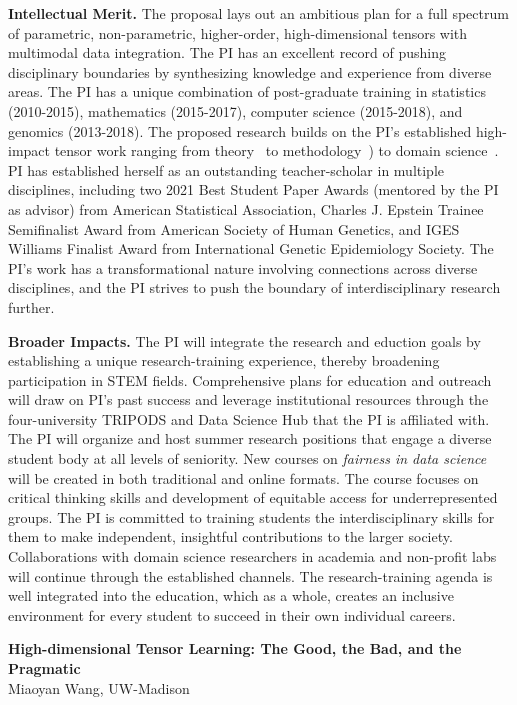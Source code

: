 \documentclass[11pt]{article}
\theoremstyle{exampstyle}
\theoremstyle{definition}
\begin{document}
{\bf Intellectual Merit.} The proposal lays out an ambitious plan for a full spectrum of parametric, non-parametric, higher-order, high-dimensional tensors with multimodal data integration. 
The PI has an excellent record of pushing disciplinary boundaries by synthesizing knowledge and experience from diverse areas. The PI has a unique combination of post-graduate training in statistics (2010-2015), mathematics (2015-2017), computer science (2015-2018), and genomics (2013-2018). The proposed research builds on the PI's established high-impact tensor work ranging from theory~\cite{wang2018learning, han2020exact,wang7,wang8,wang2} to methodology~\cite{wang2019multiway, wang1, wang3, wang4, pmlr-v119-lee20i}) to domain science~\cite{wang2019three,wang5,wang9,wang6,wang10}. PI has established herself as an outstanding teacher-scholar in multiple disciplines, including two 2021 Best Student Paper Awards (mentored by the PI as advisor) from American Statistical Association, Charles J. Epstein Trainee Semifinalist Award from American Society of Human Genetics, and IGES Williams Finalist Award from International Genetic Epidemiology Society. The PI’s work has a transformational nature involving connections across diverse disciplines, and the PI strives to push the boundary of interdisciplinary research further.

{\bf Broader Impacts.} The PI will integrate the research and eduction goals by establishing a unique research-training experience, thereby broadening participation in STEM fields. Comprehensive plans for education and outreach will draw on PI's past success and leverage institutional resources through the four-university TRIPODS and Data Science Hub that the PI is affiliated with.
The PI will organize and host summer research positions that engage a diverse student body at all levels of seniority. New courses on {\it fairness in data science} will be created in both traditional and online formats. The course focuses on critical thinking skills and development of equitable access for underrepresented groups. The PI is committed to training students the interdisciplinary skills for them to make independent, insightful contributions to the larger society. Collaborations with domain science researchers in academia and non-profit labs will continue through the established channels. The research-training agenda is well integrated into the education, which as a whole, creates an inclusive environment for every student to succeed in their own individual careers.  
 
 
\newpage
\setcounter{page}{1}
\begin{center}
{\bf \large High-dimensional Tensor Learning: The Good, the Bad, and the Pragmatic}\\

Miaoyan Wang, UW-Madison
\end{center}
\vspace{-.3cm}
\end{document}
